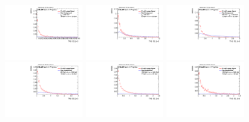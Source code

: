 \begin{figure}
\includegraphics[width=0.3\textwidth]{sascha_input/Appendix/Distributions/w/distributions/beta3/h_assisted_tj_C2_3_bin6.pdf} 
\bigskip
\includegraphics[width=0.3\textwidth]{sascha_input/Appendix/Distributions/w/distributions/beta3/h_assisted_tj_D2_3_bin1.pdf} \hspace{1mm}
\includegraphics[width=0.3\textwidth]{sascha_input/Appendix/Distributions/w/distributions/beta3/h_assisted_tj_D2_3_bin2.pdf} \hspace{1mm}
\includegraphics[width=0.3\textwidth]{sascha_input/Appendix/Distributions/w/distributions/beta3/h_assisted_tj_D2_3_bin3.pdf} 
\bigskip
\includegraphics[width=0.3\textwidth]{sascha_input/Appendix/Distributions/w/distributions/beta3/h_assisted_tj_D2_3_bin4.pdf} \hspace{1mm}
\includegraphics[width=0.3\textwidth]{sascha_input/Appendix/Distributions/w/distributions/beta3/h_assisted_tj_D2_3_bin5.pdf} \hspace{1mm}

\end{figure}

